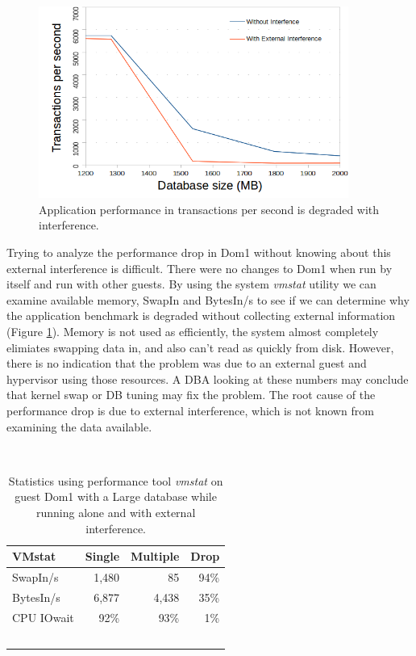 \begin{figure}[!h]
  \begin{center}
  \includegraphics[width=4in]{images/MedScale.png}
  \caption{Application performance in transactions per second is degraded with interference.}
  \label{fig:medIO}
  \end{center}
\end{figure}

Trying to analyze the performance drop in Dom1 without knowing about this external interference is difficult.  There were no changes to Dom1 when run by itself and run with other guests.  By using the system \emph{vmstat} utility we can examine available memory, SwapIn and BytesIn/s to see if we can determine why the application benchmark is degraded without collecting external information (Figure \ref{fig:vmstat}).  Memory is not used as efficiently, the system almost completely elimiates swapping data in, and also can't read as quickly from disk.  However, there is no indication that the problem was due to an external guest and hypervisor using those resources.  A DBA looking at these numbers may conclude that kernel swap or DB tuning may fix the problem.  
The root cause of the performance drop is due to external interference, which is not known from examining the data available.

\begin{table}[h]
  \begin{tabular}{ l | r | r | r }
    VMstat & Single & Multiple & Drop \\ \hline
	SwapIn/s & 1,480 & 85 & 94\% \\
	BytesIn/s & 6,877 & 4,438 & 35\% \\
	CPU IOwait & 92\% & 93\% & 1\% \\
  \end{tabular}
\caption{Statistics using performance tool \emph{vmstat} on guest Dom1 with a Large database while running alone and with external interference.} 
\label{fig:vmstat}
\end{table}

